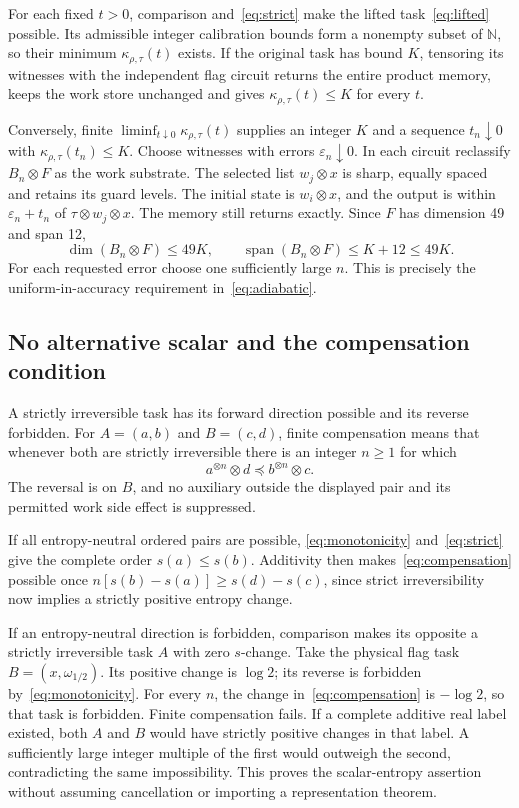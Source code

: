 For each fixed $t>0$, comparison and~\eqref{eq:strict} make the lifted task~\eqref{eq:lifted} possible. Its admissible integer calibration bounds form a nonempty subset of $\mathbb N$, so their minimum $\kappa_{\rho,\tau}(t)$ exists. If the original task has bound $K$, tensoring its witnesses with the independent flag circuit returns the entire product memory, keeps the work store unchanged and gives $\kappa_{\rho,\tau}(t)\le K$ for every $t$.

Conversely, finite $\liminf_{t\downarrow0}\kappa_{\rho,\tau}(t)$ supplies an integer $K$ and a sequence $t_n\downarrow0$ with $\kappa_{\rho,\tau}(t_n)\le K$. Choose witnesses with errors $\varepsilon_n\downarrow0$. In each circuit reclassify $B_n\otimes F$ as the work substrate. The selected list $w_j\otimes x$ is sharp, equally spaced and retains its guard levels. The initial state is $w_i\otimes x$, and the output is within $\varepsilon_n+t_n$ of $\tau\otimes w_j\otimes x$. The memory still returns exactly. Since $F$ has dimension 49 and span 12,
\[
 \dim(B_n\otimes F)\le49K,\qquad
 \operatorname{span}(B_n\otimes F)\le K+12\le49K.
\]
For each requested error choose one sufficiently large $n$. This is precisely the uniform-in-accuracy requirement in~\eqref{eq:adiabatic}.

\subsection{No alternative scalar and the compensation condition}
A strictly irreversible task has its forward direction possible and its reverse forbidden. For $A=(a,b)$ and $B=(c,d)$, finite compensation means that whenever both are strictly irreversible there is an integer $n\ge1$ for which
\begin{equation}
 a^{\otimes n}\otimes d\preceq b^{\otimes n}\otimes c. \label{eq:compensation}
\end{equation}
The reversal is on $B$, and no auxiliary outside the displayed pair and its permitted work side effect is suppressed.

If all entropy-neutral ordered pairs are possible, \eqref{eq:monotonicity} and~\eqref{eq:strict} give the complete order $s(a)\le s(b)$. Additivity then makes~\eqref{eq:compensation} possible once $n[s(b)-s(a)]\ge s(d)-s(c)$, since strict irreversibility now implies a strictly positive entropy change.

If an entropy-neutral direction is forbidden, comparison makes its opposite a strictly irreversible task $A$ with zero $s$-change. Take the physical flag task $B=(x,\omega_{1/2})$. Its positive change is $\log2$; its reverse is forbidden by~\eqref{eq:monotonicity}. For every $n$, the change in~\eqref{eq:compensation} is $-\log2$, so that task is forbidden. Finite compensation fails. If a complete additive real label existed, both $A$ and $B$ would have strictly positive changes in that label. A sufficiently large integer multiple of the first would outweigh the second, contradicting the same impossibility. This proves the scalar-entropy assertion without assuming cancellation or importing a representation theorem.

